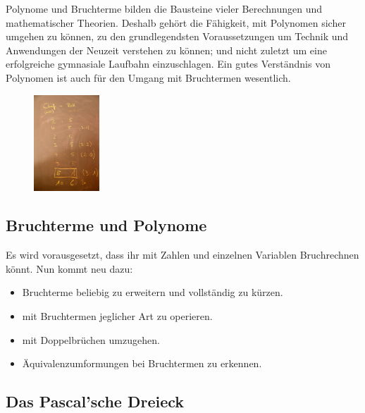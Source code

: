 \documentclass[%
11pt,%
twoside,%
titlepage,%
german,%
]{scrartcl}
\begin{document}
Polynome und Bruchterme bilden die Bausteine vieler Berechnungen und mathematischer Theorien. Deshalb gehört die Fähigkeit, mit Polynomen sicher umgehen zu können, zu den grundlegendsten Voraussetzungen um Technik und Anwendungen der Neuzeit verstehen zu können; und nicht zuletzt um eine erfolgreiche gymnasiale Laufbahn einzuschlagen. Ein gutes Verständnis von Polynomen ist auch für den Umgang mit Bruchtermen wesentlich.

\begin{figure}
  \begin{center}
    \includegraphics[width=0.22\textwidth]{pictures/rokwidboard}
  \end{center}
\end{figure}

\subsection{Bruchterme und Polynome}
Es wird vorausgesetzt, dass ihr mit Zahlen und einzelnen Variablen Bruchrechnen könnt. Nun kommt neu dazu:

\begin{itemize}
\item Bruchterme beliebig zu erweitern und voll\-st\"an\-dig zu kürzen.
\item mit Bruchtermen jeglicher Art zu operieren.
\item mit Doppelbr\"uchen umzugehen.
\item \"Aquivalenzumformungen bei Bruchtermen zu erkennen.
\end{itemize}

\subsection{Das Pascal'sche Dreieck}
\end{document}

